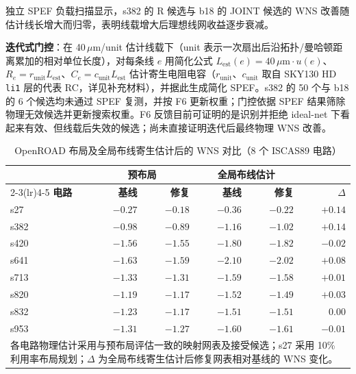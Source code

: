 \documentclass[twocolumn,10pt,fontset=windows]{ctexart}
\begin{document}
\FloatBarrier

独立 SPEF 负载扫描显示，s382 的 R 候选与 b18 的 JOINT 候选的 WNS 改善随估计线长增大而归零，表明线载增大后理想线网收益逐步衰减。

\textbf{迭代式门控}：在 40\,$\mu$m/unit 估计线载下（unit 表示一次扇出后沿拓扑/曼哈顿距离累加的相对单位长度），对每条线 $e$ 用简化公式 $L_{\mathrm{est}}(e)=40\,\mu\mathrm{m} \cdot u(e)$、$R_e=r_{\mathrm{unit}}L_{\mathrm{est}}$、$C_e=c_{\mathrm{unit}}L_{\mathrm{est}}$ 估计寄生电阻电容（$r_{\mathrm{unit}}$、$c_{\mathrm{unit}}$ 取自 SKY130 HD \texttt{li1} 层的代表 RC，详见补充材料），并据此生成简化 SPEF。s382 的 50 个与 b18 的 6 个候选均未通过 SPEF 复测，并按 F6 更新权重；门控依据 SPEF 结果筛除物理无效候选并更新搜索权重。F6 反馈目前可证明的是识别并拒绝 ideal-net 下看起来有效、但线载后失效的候选；尚未直接证明迭代后最终物理 WNS 改善。

\FloatBarrier

\begin{table}[ht]
\centering
\caption{OpenROAD 布局及全局布线寄生估计后的 WNS 对比（8 个 ISCAS89 电路）}
\label{tab:pr8}
\footnotesize
\setlength{\tabcolsep}{2pt}
\begin{tabular}{lrrrrr}
\toprule
 & \multicolumn{2}{c}{\textbf{预布局}} & \multicolumn{2}{c}{\textbf{全局布线估计}} & \\
\cmidrule(lr){2-3}\cmidrule(lr){4-5}
\textbf{电路} & \textbf{基线} & \textbf{修复} & \textbf{基线} & \textbf{修复} & $\Delta$ \\
\midrule
s27  & $-0.27$ & $-0.18$ & $-0.36$ & $-0.22$ & $+0.14$ \\
s382 & $-0.98$ & $-0.89$ & $-1.16$ & $-1.02$ & $+0.14$ \\
s420 & $-1.56$ & $-1.55$ & $-1.80$ & $-1.82$ & $-0.02$ \\
s641 & $-1.63$ & $-1.59$ & $-2.10$ & $-2.02$ & $+0.08$ \\
s713 & $-1.33$ & $-1.31$ & $-1.59$ & $-1.58$ & $+0.01$ \\
s820 & $-1.19$ & $-1.17$ & $-1.52$ & $-1.49$ & $+0.03$ \\
s832 & $-1.23$ & $-1.17$ & $-1.51$ & $-1.51$ & $0.00$ \\
s953 & $-1.31$ & $-1.27$ & $-1.60$ & $-1.61$ & $-0.01$ \\
\bottomrule
\multicolumn{6}{p{0.92\columnwidth}}{\footnotesize 各电路物理估计采用与预布局评估一致的映射网表及接受候选；s27 采用 10\% 利用率布局规划；$\Delta$ 为全局布线寄生估计后修复网表相对基线的 WNS 变化。}\\
\end{tabular}
\end{table}
\end{document}
